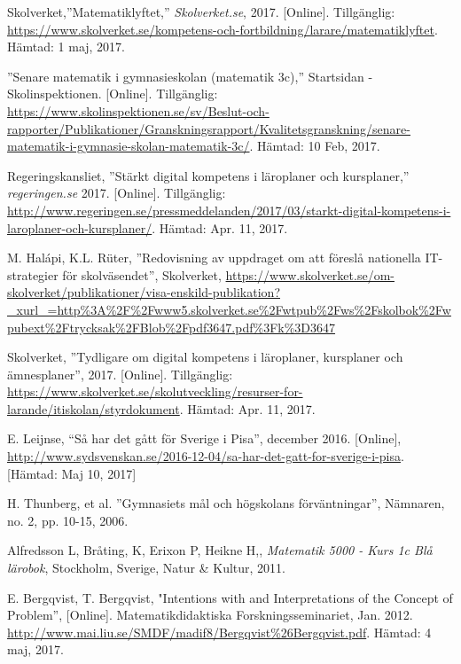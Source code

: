     
    
    Skolverket,''Matematiklyftet,'' \textsl{Skolverket.se}, 2017. [Online]. Tillgänglig: \url{https://www.skolverket.se/kompetens-och-fortbildning/larare/matematiklyftet}. Hämtad: 1 maj, 2017.
    
    
    
    ''Senare matematik i gymnasieskolan (matematik 3c),'' Startsidan - Skolinspektionen. [Online]. Tillgänglig: \url{https://www.skolinspektionen.se/sv/Beslut-och-rapporter/Publikationer/Granskningsrapport/Kvalitetsgranskning/senare-matematik-i-gymnasie-skolan-matematik-3c/}. Hämtad: 10 Feb, 2017.
    
    
    
    Regeringskansliet, ''Stärkt digital kompetens i läroplaner och kursplaner,'' \textsl{regeringen.se} 2017. [Online]. Tillgänglig: \url{http://www.regeringen.se/pressmeddelanden/2017/03/starkt-digital-kompetens-i-laroplaner-och-kursplaner/}. Hämtad: Apr. 11, 2017.
    
    M. Halápi, K.L. Rüter, ''Redovisning av uppdraget om att föreslå nationella IT-strategier för skolväsendet'', Skolverket,
    \url{https://www.skolverket.se/om-skolverket/publikationer/visa-enskild-publikation?_xurl_=http\%3A\%2F\%2Fwww5.skolverket.se\%2Fwtpub\%2Fws\%2Fskolbok\%2Fwpubext\%2Ftrycksak\%2FBlob\%2Fpdf3647.pdf\%3Fk\%3D3647}
    
   Skolverket, ''Tydligare om digital kompetens i läroplaner, kursplaner och ämnesplaner'', 2017. [Online]. Tillgänglig: \url{https://www.skolverket.se/skolutveckling/resurser-for-larande/itiskolan/styrdokument}. Hämtad: Apr. 11, 2017.
   
    E. Leijnse, “Så har det gått för Sverige i Pisa”, december 2016. [Online], \url{http://www.sydsvenskan.se/2016-12-04/sa-har-det-gatt-for-sverige-i-pisa}. 
    [Hämtad: Maj 10, 2017]
   
    H. Thunberg, et al. ”Gymnasiets mål och högskolans förväntningar”, Nämnaren, no. 2, pp. 10-15, 2006.
   
    Alfredsson L, Bråting, K, Erixon P, Heikne H,, \textit{Matematik 5000 - Kurs 1c Blå lärobok}, Stockholm, Sverige, Natur \& Kultur, 2011.
    
     E. Bergqvist, T. Bergqvist,  "Intentions with and Interpretations of the Concept of Problem”, [Online]. Matematikdidaktiska Forskningsseminariet, Jan. 2012. \url{http://www.mai.liu.se/SMDF/madif8/Bergqvist\%26Bergqvist.pdf}. Hämtad: 4 maj, 2017.
 
